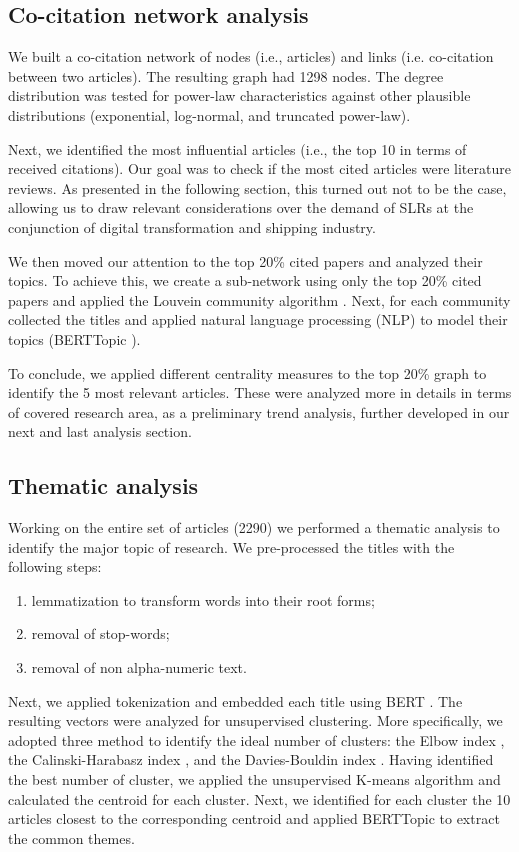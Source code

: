 \documentclass[a4paper, review, endfloat, authoryear]{elsarticle}
\begin{document}
	\subsection{Co-citation network analysis}
	We built a co-citation network of nodes (i.e., articles) and links (i.e. co-citation between two articles). The resulting graph had 1298 nodes. The degree distribution was tested for power-law characteristics against other plausible distributions (exponential, log-normal, and truncated power-law).
	
	Next, we identified the most influential articles (i.e., the top 10 in terms of received citations). Our goal was to check if the most cited articles were literature reviews. As presented in the following section, this turned out not to be the case, allowing us to draw relevant considerations over the demand of SLRs at the conjunction of digital transformation and shipping industry.
	
	We then moved our attention to the top 20\% cited papers and analyzed their topics. To achieve this, we create a sub-network using only the top 20\% cited papers and applied the Louvein community algorithm \citep{blondel2008fast}. Next, for each community collected the titles and applied natural language processing (NLP) to model their topics (BERTTopic \citep{paulcombining}).
	
	To conclude, we applied different centrality measures to the top 20\% graph to identify the 5 most relevant articles. These were analyzed more in details in terms of covered research area, as a preliminary trend analysis, further developed in our next and last analysis section.
	
	\subsection{Thematic analysis}
	Working on the entire set of articles (2290) we performed a thematic analysis to identify the major topic of research. We pre-processed the titles with the following steps:
	\begin{enumerate}
		\item lemmatization to transform words into their root forms;
		\item removal of stop-words;
		\item removal of non alpha-numeric text.
	\end{enumerate}
	Next, we applied tokenization and embedded each title using BERT \citep{devlin2018bert}. The resulting vectors were analyzed for unsupervised clustering. More specifically, we adopted three method to identify the ideal number of clusters: the Elbow index \citep{cui2020introduction}, the Calinski-Harabasz index \citep{calinski1974dendrite}, and the Davies-Bouldin index \citep{davies1979cluster}.
	Having identified the best number of cluster, we applied the unsupervised K-means algorithm and calculated the centroid for each cluster.
	Next, we identified for each cluster the 10 articles closest to the corresponding centroid and applied BERTTopic to extract the common themes.
	
\end{document}
